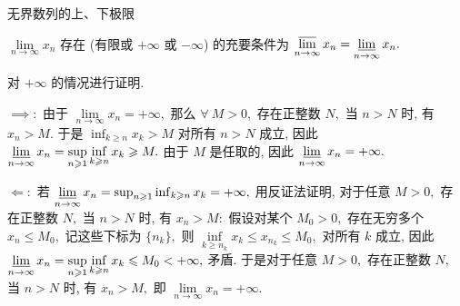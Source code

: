 
\begin{frame}{无界数列的上、下极限}

\begin{thm}
$\lim\limits_{n\to\infty} x_n$ 存在 (有限或 $+\infty$ 或 $-\infty$) 的充要条件为 $\varlimsup\limits_{n\to\infty} x_n = \varliminf\limits_{n\to\infty} x_n.$
\end{thm}

\pause

对 $+\infty$ 的情况进行证明.

$\implies:$ 由于 $\lim\limits_{n\to\infty} x_n = +\infty,$ 那么 $\forall~M > 0,$ 存在正整数 $N,$ 当 $n > N$ 时, 有 $x_n > M.$ 于是 $\inf_{k \geqslant n} x_k > M$ 对所有 $n > N$ 成立, 因此 $\varliminf\limits_{n\to\infty} x_n = \sup\limits_{n \geqslant 1} \inf\limits_{k \geqslant n} x_k \geqslant M.$ 由于 $M$ 是任取的, 因此 $\varliminf\limits_{n\to\infty} x_n = +\infty.$

\pause
\vspace{1em}

$\Longleftarrow:$ 若 $\varliminf\limits_{n\to\infty} x_n = \sup_{n\geqslant 1}\inf_{k \geqslant n} x_k = +\infty,$ 用反证法证明, 对于任意 $M > 0,$ 存在正整数 $N,$ 当 $n > N$ 时, 有 $x_n > M:$ 假设对某个 $M_0 > 0,$ 存在无穷多个 $x_n \leqslant M_0,$ 记这些下标为 $\{n_k\},$ 则 $\inf\limits_{k \geqslant n_k} x_k \leqslant x_{n_k} \leqslant M_0,$ 对所有 $k$ 成立, 因此 $\varliminf\limits_{n\to\infty} x_n = \sup\limits_{n \geqslant 1} \inf\limits_{k \geqslant n} x_k \leqslant M_0 < +\infty,$ 矛盾. 于是对于任意 $M > 0,$ 存在正整数 $N,$ 当 $n > N$ 时, 有 $x_n > M,$ 即 $\lim\limits_{n\to\infty} x_n = +\infty.$

\end{frame}


